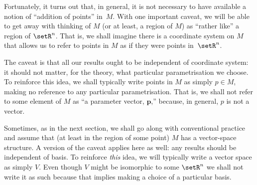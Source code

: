 \documentclass[10pt, a4paper]{article}
\begin{document}
Fortunately, it turns out that, in general, it is not necessary to
have available a notion of ``addition of points'' in~$M$. With one
important caveat, we will be able to get away with thinking of $M$ (or
at least, a region of $M$) as ``rather like'' a region of
$\setR^n$. That is, we shall imagine there is a coordinate system on
$M$ that allows us to refer to points in $M$ as if they were points
in~$\setR^n$.

The caveat is that all our results ought to be independent of
coordinate system: it should not matter, for the theory, what
particular parametrisation we choose. To reinforce this idea, we shall
typically write points in $M$ as simply $p\in M$, making no reference to
any particular parametrisation. That is, we shall not refer to some
element of $M$ as ``a parameter vector, $\mathbold{p}$,'' because, in
general, $p$ is not a vector.

Sometimes, as in the next section, we shall go along with conventional
practice and assume that (at least in the region of some point) $M$
has a vector-space structure. A version of the caveat applies here as
well: any results should be independent of basis. To reinforce
\emph{this} idea, we will typically write a vector space as simply
$V$. Even though $V$ might be isomorphic to some $\setR^n$ we shall
not write it as such because that implies making a choice of a
particular basis.

\end{document}
